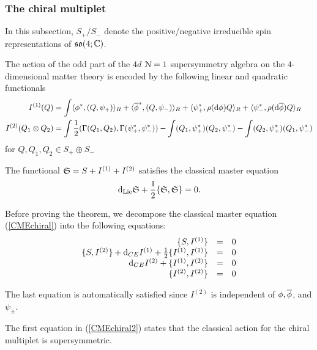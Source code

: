 \documentclass[10pt, oneside]{article}
\begin{document}
\subsubsection{The chiral multiplet}

In this subsection, $S_+ / S_-$ denote the positive/negative irreducible spin representations of $\mf{so}(4; \CC)$. 

The action of the odd part of the $4d$ $\cN=1$ supersymmetry algebra on the $4$-dimensional matter theory is encoded by the following linear and quadratic functionals 
\begin{align*}
I^{(1)}(Q) & = \int \<\phi^*, (Q, \psi_+)\>_R + \<\Bar{\phi}^*, (Q, \psi_-)\>_R + \<\psi_+^*, \rho(\d \phi)Q \>_R +  \<\psi_-^*, \rho(\d \Bar{\phi})Q \>_R \\
I^{(2)}  (Q_1 \otimes Q_2) & = \int \frac{1}{2}(\Gamma(Q_1, Q_2), \Gamma(\psi_+^*, \psi_-^*)) - \int (Q_1, \psi_+^*)(Q_2, \psi_-^*) - \int (Q_2, \psi_+^*)(Q_1, \psi_-^*) 
\end{align*}
for $Q, Q_1, Q_2 \in S_+ \oplus S_-$

\begin{thm}
The functional $\fS = S + I^{(1)} + I^{(2)}$ satisfies the classical master equation
\begin{equation}\label{CMEchiral}
\d_{\rm Lie} \fS + \frac{1}{2} \{\fS, \fS\} = 0 .
\end{equation}
\end{thm}

Before proving the theorem, we decompose the classical master equation (\ref{CMEchiral}) into the following equations:
\begin{equation}\label{CMEchiral2}
\begin{array}{rrrrrr}
\{S , I^{(1)}\} & = & 0 \\ 
\{S, I^{(2)}\} + \d_{CE} I^{(1)} + \frac{1}{2} \{I^{(1)}, I^{(1)}\} & = & 0 \\
\d_{CE} I^{(2)} + \{I^{(1)}, I^{(2)}\} & =& 0 \\
\{I^{(2)}, I^{(2)}\} & =& 0
\end{array}
\end{equation}

The last equation is automatically satisfied since $I^{(2)}$ is independent of $\phi, \Bar{\phi}$, and $\psi_{\pm}$. 

The first equation in (\ref{CMEchiral2}) states that the classical action for the chiral multiplet is supersymmetric. 
\end{document}
